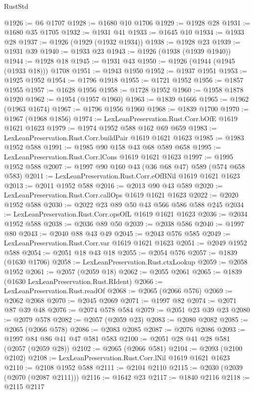 \begin{lexlean}{RustStd}
\begin{coremodule}
@1926 := @6 @1707
@1928 := @1680 @10 @1706
@1929 := @1928 @28
@1931 := @1680 @35 @1705
@1932 := @1931 @41
@1933 := @1645 @10
@1934 := @1933 @28
@1937 := @1926 (@1929 (@1932 @1934))
@1938 := @1928 @23
@1939 := @1931 @39
@1940 := @1933 @23
@1943 := @1926 (@1938 (@1939 @1940))
@1944 := @1928 @18
@1945 := @1931 @43
@1950 := @1926 (@1944 (@1945 (@1933 @18))) @1708
@1951 := @1943 @1950
@1952 := @1937 @1951
@1953 := @1925 @1952
@1954 := @1796 @1918
@1955 := @1721 @1952
@1956 := @1857 @1955
@1957 := @1628 @1956
@1958 := @1728 @1952
@1960 := @1958 @1878 @1920
@1962 := @1954 (@1957 @1960)
@1963 := @1839 @1666
@1965 := @1962 (@1963 @1674)
@1967 := @1796 @1956 @1960
@1968 := @1839 @1700
@1970 := @1967 (@1968 @1856)
@1974 := LexLeanPreservation.Rust.Corr.bOfE @1619 @1621 @1623
@1979 := @1974 @1952 @588 @162 @69 @659
@1983 := LexLeanPreservation.Rust.Corr.buildPair @1619 @1621 @1623
@1985 := @1983 @1952 @588
@1991 := @1985 @90 @158 @43 @68 @589 @658
@1995 := LexLeanPreservation.Rust.Corr.lCons @1619 @1621 @1623
@1997 := @1995 @1952 @588
@2007 := @1997 @90 @160 @43 (@36 @68 @47) @589 (@574 @658 @583)
@2011 := LexLeanPreservation.Rust.Corr.eOfBNil @1619 @1621 @1623
@2013 := @2011 @1952 @588
@2016 := @2013 @90 @43 @589
@2020 := LexLeanPreservation.Rust.Corr.callOps @1619 @1621 @1623
@2022 := @2020 @1952 @588
@2030 := @2022 @23 @89 @50 @43 @566 @586 @588 @245
@2034 := LexLeanPreservation.Rust.Corr.opsOfL @1619 @1621 @1623
@2036 := @2034 @1952 @588
@2038 := @2036 @89 @50
@2039 := @2038 @586
@2040 := @1997 @80
@2043 := @2040 @88 @43 @49
@2045 := @2043 @576 @585
@2049 := LexLeanPreservation.Rust.Corr.var @1619 @1621 @1623
@2051 := @2049 @1952 @588
@2054 := @2051 @18 @43 @18
@2055 := @2054 @576
@2057 := @1839 (@1630 @1706)
@2058 := LexLeanPreservation.Rust.ctxLookup
@2059 := @2058 @1952
@2061 := @2057 (@2059 @18)
@2062 := @2055 @2061
@2065 := @1839 (@1630 LexLeanPreservation.Rust.RIdent)
@2066 := LexLeanPreservation.Rust.readOf
@2068 := @2065 (@2066 @576)
@2069 := @2062 @2068
@2070 := @2045 @2069
@2071 := @1997 @82
@2074 := @2071 @87 @39 @48
@2076 := @2074 @578 @584
@2079 := @2051 @23 @39 @23
@2080 := @2079 @578
@2082 := @2057 (@2059 @23)
@2083 := @2080 @2082
@2085 := @2065 (@2066 @578)
@2086 := @2083 @2085
@2087 := @2076 @2086
@2093 := @1997 @84 @86 @41 @47 @581 @583
@2100 := @2051 @28 @41 @28 @581 (@2057 (@2059 @28))
@2102 := @2065 (@2066 @581)
@2104 := @2093 (@2100 @2102)
@2108 := LexLeanPreservation.Rust.Corr.lNil @1619 @1621 @1623
@2110 := @2108 @1952 @588
@2111 := @2104 @2110
@2115 := @2030 (@2039 (@2070 (@2087 @2111)))
@2116 := @1642 @23
@2117 := @1840 @2116
@2118 := @2115 @2117

\end{coremodule}
\end{lexlean}
